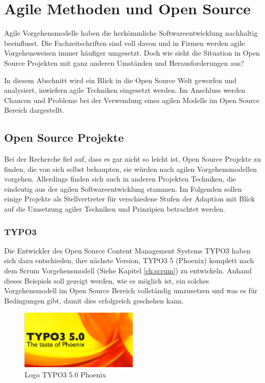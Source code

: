 \section{Agile Methoden und Open Source}
Agile Vorgehensmodelle haben die herkömmliche Softwareentwicklung nachhaltig beeinflusst. Die Fachzeitschriften sind voll davon und in Firmen werden agile Vorgehensweisen immer häufiger umgesetzt. Doch wie sieht die Situation in Open Source Projekten mit ganz anderen Umständen und Herausforderungen aus?

In diesem Abschnitt wird ein Blick in die Open Source Welt geworfen und analysiert, inwiefern agile Techniken eingesetzt werden. Im Anschluss werden Chancen und Probleme bei der Verwendung eines agilen Modells im Open Source Bereich dargestellt.

\subsection{Open Source Projekte}
Bei der Recherche fiel auf, dass es gar nicht so leicht ist, Open Source Projekte zu finden, die von sich selbst behaupten, sie würden nach agilen Vorgehensmodellen vorgehen. Allerdings finden sich auch in anderen Projekten Techniken, die eindeutig aus der agilen Softwareentwicklung stammen. Im Folgenden sollen einige Projekte als Stellvertreter für verschiedene Stufen der Adaption mit Blick auf die Umsetzung agiler Techniken und Prinzipien betrachtet werden.

\subsubsection{TYPO3}
Die Entwickler des Open Source Content Management Systems TYPO3 haben sich dazu entschieden, ihre nächste Version, TYPO3 5 (Phoenix) komplett nach dem Scrum Vorgehensmodell  (Siehe Kapitel \ref{ch:scrum}) zu entwickeln. Anhand dieses Beispiels soll gezeigt werden, wie es möglich ist, ein solches Vorgehensmodell im Open Source Bereich vollständig umzusetzen und was es für Bedingungen gibt, damit dies erfolgreich geschehen kann.
\begin{figure}[h]
	\centering
	\includegraphics[width=0.5\textwidth]{images/typo3_Phoenix_logo.jpg}
	\caption{Logo TYPO3 5.0 Phoenix\cite{bib:phoenix-logo}}
	\label{Logo-Phoenix}
\end{figure}

